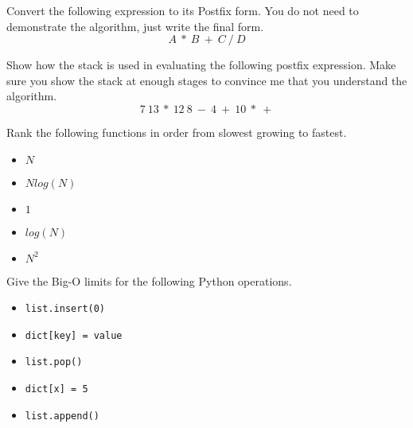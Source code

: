 \documentclass[11pt]{exam}
\begin{document}
\begin{questions}





\question[5] Convert the following expression to its Postfix form.  You do not need to demonstrate the algorithm, just write the final form.
$$A~*~B~+~C~/~D$$
\vspace{1.5in}

\question[5] Show how the stack is used in evaluating the following postfix expression.  Make sure you show the stack at enough stages to convince me that you understand the algorithm.
$$7~13~*~12~8~-~4~+~10~*~+$$
\vspace{1.5in}

\newpage
\question[5] Rank the following functions in order from slowest
growing to fastest.
\begin{itemize}
\item $N$
\item $N log(N)$
\item $1$
\item $log(N)$
\item $N^2$
\end{itemize}

\question[5] Give the Big-O limits for the following Python operations.
\begin{itemize}
\item \texttt{list.insert(0)}
\item \texttt{dict[key] = value}
\item \texttt{list.pop()}
\item \texttt{dict[x] = 5}
\item \texttt{list.append()}
\end{itemize}


\end{questions}
\end{document}
